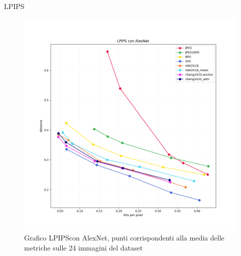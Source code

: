     \begin{frame}{LPIPS}
        \begin{figure}[t!]
            \centering
            \includegraphics[width=0.57\textheight]{Immagini/METRICS/LPIPS.png}
            \caption{Grafico LPIPS\footnotemark[1] con AlexNet, punti corrispondenti alla media delle metriche sulle 24 immagini del dataset}
            \label{fig:GraphLPIPS}
        \end{figure}
    \end{frame}
    
    
